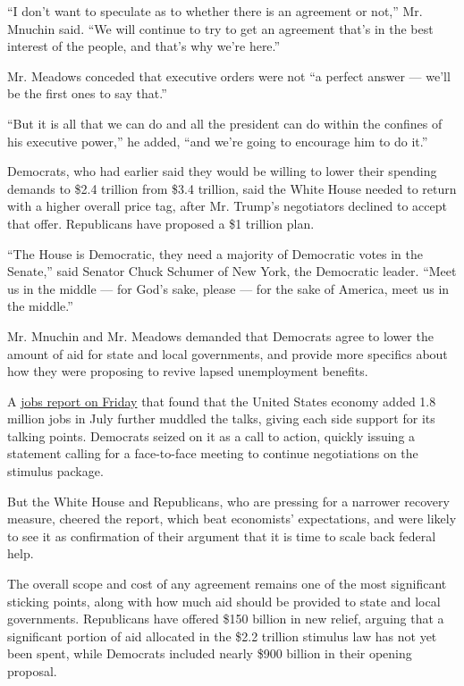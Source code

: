 ``I don't want to speculate as to whether there is an agreement or
not,'' Mr. Mnuchin said. ``We will continue to try to get an agreement
that's in the best interest of the people, and that's why we're here.''

Mr. Meadows conceded that executive orders were not ``a perfect answer
--- we'll be the first ones to say that.''

``But it is all that we can do and all the president can do within the
confines of his executive power,'' he added, ``and we're going to
encourage him to do it.''

Democrats, who had earlier said they would be willing to lower their
spending demands to \$2.4 trillion from \$3.4 trillion, said the White
House needed to return with a higher overall price tag, after Mr.
Trump's negotiators declined to accept that offer. Republicans have
proposed a \$1 trillion plan.

``The House is Democratic, they need a majority of Democratic votes in
the Senate,'' said Senator Chuck Schumer of New York, the Democratic
leader. ``Meet us in the middle --- for God's sake, please --- for the
sake of America, meet us in the middle.''

Mr. Mnuchin and Mr. Meadows demanded that Democrats agree to lower the
amount of aid for state and local governments, and provide more
specifics about how they were proposing to revive lapsed unemployment
benefits.

A
\href{https://www.nytimes.com/2020/08/07/business/economy/july-jobs-report.html}{jobs
report on Friday} that found that the United States economy added 1.8
million jobs in July further muddled the talks, giving each side support
for its talking points. Democrats seized on it as a call to action,
quickly issuing a statement calling for a face-to-face meeting to
continue negotiations on the stimulus package.

But the White House and Republicans, who are pressing for a narrower
recovery measure, cheered the report, which beat economists'
expectations, and were likely to see it as confirmation of their
argument that it is time to scale back federal help.

The overall scope and cost of any agreement remains one of the most
significant sticking points, along with how much aid should be provided
to state and local governments. Republicans have offered \$150 billion
in new relief, arguing that a significant portion of aid allocated in
the \$2.2 trillion stimulus law has not yet been spent, while Democrats
included nearly \$900 billion in their opening proposal.

